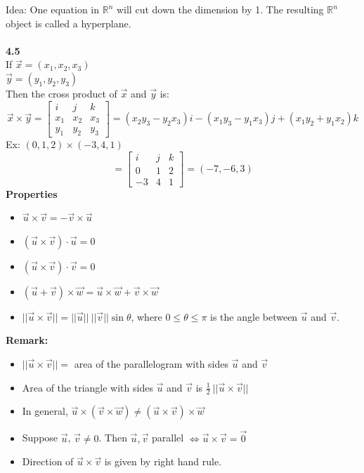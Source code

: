\documentclass[]{article}
\begin{document}
		Idea: One equation in  $\mathbb{R}^n$ will cut down the dimension by 1. The resulting $\mathbb{R}^n$ object is called a hyperplane.\\\\
		{\bf 4.5}\\
		If $\vec{x}=(x_1,x_2,x_3)$\\
		$\vec{y}=(y_1,y_2,y_3)$\\
		Then the cross product of $\vec{x}$ and $\vec{y}$ is:\\
		$$
		\vec{x}\times\vec{y}=
		\begin{bmatrix}
			{i} & {j} & {k}\\
			{x_1} & {x_2} & {x_3}\\
			{y_1} & {y_2} & {y_3}
		\end{bmatrix}=(x_2y_3-y_2x_3)i-(x_1y_3-y_1x_3)j+(x_1y_2+y_1x_2)k
		$$	
		Ex: $(0,1,2)\times(-3,4,1)$
		$$
		=\begin{bmatrix}
			{i} & {j} & {k}\\
			{0} & {1} & {2}\\
			{-3} & {4} & {1}
		\end{bmatrix}=(-7,-6,3)
		$$
		{\bf Properties}
		\begin{itemize}
			\item $\vec{u}\times\vec{v}=-\vec{v}\times\vec{u}$
			\item $(\vec{u}\times\vec{v})\cdot\vec{u}=0$
			\item $(\vec{u}\times\vec{v})\cdot\vec{v}=0$
			\item $(\vec{u}+\vec{v})\times\vec{w}=\vec{u}\times\vec{w}+\vec{v}\times\vec{w}$
			\item $|| \vec{u}\times\vec{v} ||=|| \vec{u} ||~||\vec{v} ||\sin\theta$, where $0\le\theta\le\pi$ is the angle between $\vec{u}$ and $\vec{v}$.
		\end{itemize}
		{\bf Remark:} 
		\begin{itemize}
			\item $||\vec{u}\times\vec{v}||=$ area of the parallelogram with sides $\vec{u}$ and $\vec{v}$
			\item Area of the triangle with sides $\vec{u}$ and $\vec{v}$ is $\frac{1}{2}~||\vec{u}\times\vec{v}||$
			\item In general, $\vec{u}\times(\vec{v}\times\vec{w})\ne(\vec{u}\times\vec{v})\times\vec{w}$
			\item Suppose $\vec{u}$, $\vec{v}\ne 0$. Then $\vec{u}, \vec{v}$ parallel $\iff\vec{u}\times\vec{v}=\vec{0}$
			\item Direction of $\vec{u}\times\vec{v}$ is given by right hand rule.
		\end{itemize}
\end{document}
